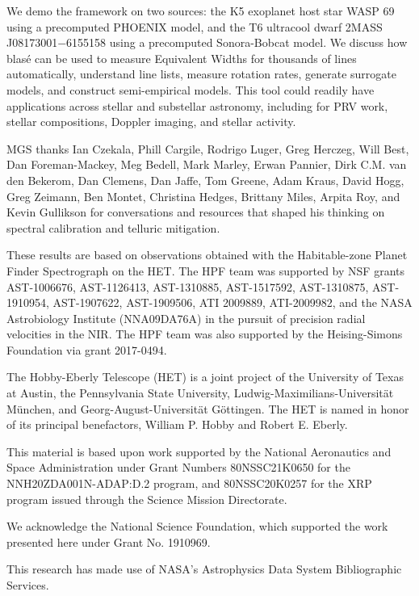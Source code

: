 \documentclass[twocolumn]{aastex631}
\begin{document}
We demo the framework on two sources: the K5 exoplanet host star WASP 69 using a precomputed PHOENIX model, and the T6 ultracool dwarf 2MASS J08173001$-$6155158 using a precomputed Sonora-Bobcat model.  We discuss how blas\'e can be used to measure Equivalent Widths for thousands of lines automatically, understand line lists, measure rotation rates, generate surrogate models, and construct semi-empirical models.  This tool could readily have applications across stellar and substellar astronomy, including for PRV work, stellar compositions, Doppler imaging, and stellar activity.

\begin{acknowledgments}

    MGS thanks Ian Czekala, Phill Cargile, Rodrigo Luger, Greg Herczeg, Will Best, Dan Foreman-Mackey, Meg Bedell, Mark Marley, Erwan Pannier, Dirk C.M. van den Bekerom, Dan Clemens, Dan Jaffe, Tom Greene, Adam Kraus, David Hogg, Greg Zeimann, Ben Montet, Christina Hedges, Brittany Miles, Arpita Roy, and Kevin Gullikson for conversations and resources that shaped his thinking on spectral calibration and telluric mitigation.

    These results are based on observations obtained with the Habitable-zone Planet Finder Spectrograph on the HET. The HPF team was supported by NSF grants AST-1006676, AST-1126413, AST-1310885, AST-1517592, AST-1310875, AST-1910954, AST-1907622, AST-1909506, ATI 2009889, ATI-2009982, and the NASA Astrobiology Institute (NNA09DA76A) in the pursuit of precision radial velocities in the NIR. The HPF team was also supported by the Heising-Simons Foundation via grant 2017-0494.

    The Hobby-Eberly Telescope (HET) is a joint project of the University of Texas at Austin, the Pennsylvania State University, Ludwig-Maximilians-Universit\"at M\"unchen, and Georg-August-Universit\"at G\"ottingen. The HET is named in honor of its principal benefactors, William P. Hobby and Robert E. Eberly.

    This material is based upon work supported by the National Aeronautics and Space Administration under Grant Numbers 80NSSC21K0650 for the NNH20ZDA001N-ADAP:D.2 program,
    and 80NSSC20K0257 for the XRP program issued through the Science Mission Directorate.

    We acknowledge the National Science Foundation, which supported the work presented here under Grant No. 1910969.

    This research has made use of NASA's Astrophysics Data System Bibliographic Services.

\end{acknowledgments}
\end{document}
